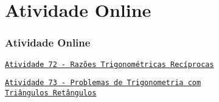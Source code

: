 \section{Atividade Online}
\begin{frame}
\frametitle{Atividade Online} 



\href{https://pt.khanacademy.org/math/trigonometry/trigonometry-right-triangles/reciprocal-trig-ratios/e/reciprocal_trig_funcs}
{{\tt Atividade 72 - Razões Trigonométricas Recíprocas}}

\href{https://pt.khanacademy.org/math/trigonometry/trigonometry-right-triangles/modeling-with-right-triangles/e/applying-right-triangles}
{{\tt Atividade 73 - Problemas de Trigonometria com \\ Triângulos Retângulos}}




\end{frame}

